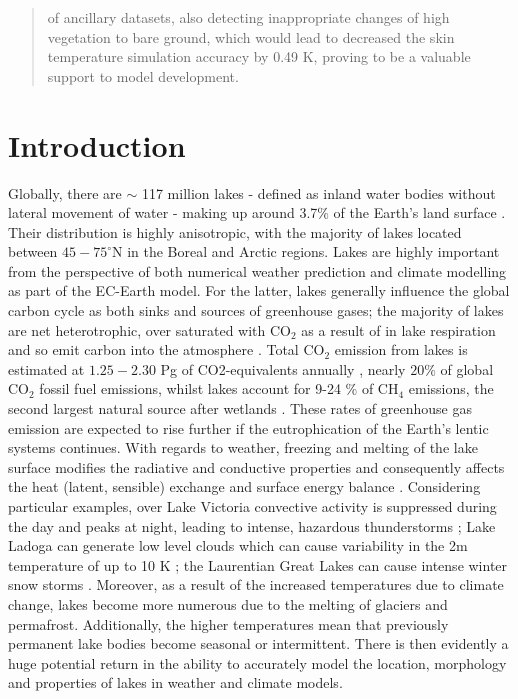 \documentclass[hess, twostagejnl]{copernicus}
\begin{document}
\begin{abstract}
of ancillary datasets, also detecting inappropriate changes of high vegetation to bare ground, which would lead to decreased the skin temperature simulation accuracy by 0.49 K, proving to be a valuable support to model development.
\end{abstract}




\section{Introduction}
\noindent Globally, there are $\sim$ 117 million lakes - defined as inland water bodies without lateral movement of water - making up around 3.7$\%$ of the Earth's land surface \citep{Verpoorter2014}. Their distribution is highly anisotropic, with the majority of lakes located between $45-75^{\circ}$N in the Boreal and Arctic regions. Lakes are highly important from the perspective of both numerical weather prediction and climate modelling as part of the EC-Earth model. For the latter, lakes generally influence the global carbon cycle as both sinks and sources of greenhouse gases; the majority of lakes are net heterotrophic, over saturated with CO$_2$ as a result of in lake respiration and so emit carbon into the atmosphere \citep{Pace2005,Tranvik2009}.  Total CO$_2$ emission from lakes is estimated at $1.25 - 2.30$ Pg of CO2-equivalents annually \citep{DelSontro2018}, nearly $20 \%$ of global CO$_2$ fossil fuel emissions, whilst lakes account for 9-24 $\%$  of CH$_4$ emissions, the second largest natural source after wetlands \citep{Saunois2020}. These rates of greenhouse gas emission are expected to rise further if the eutrophication of the Earth's lentic systems continues. With regards to weather, freezing and melting of the lake surface modifies the radiative and conductive properties and consequently affects the heat (latent, sensible) exchange and surface energy balance \citep{Huang2019,Peng2020,Franz2018}. Considering particular examples, over Lake Victoria convective activity is suppressed during the day and peaks at night, leading to intense, hazardous thunderstorms \citep{Thiery2015,Thiery_2017}; Lake Ladoga can generate low level clouds which can cause variability in the 2m temperature of up to 10 K \citep{Eerola2014}; the Laurentian Great Lakes can cause intense winter snow storms \citep{Vavrus2013} \citep{Notaro2013}. Moreover, as a result of the increased temperatures due to climate change, lakes become more numerous due to the melting of glaciers and permafrost. Additionally, the higher temperatures mean that previously permanent lake bodies become seasonal or intermittent. There is then evidently a huge potential return in the ability to accurately model the location, morphology and properties of lakes in weather and climate models. \newline 
\end{document}
